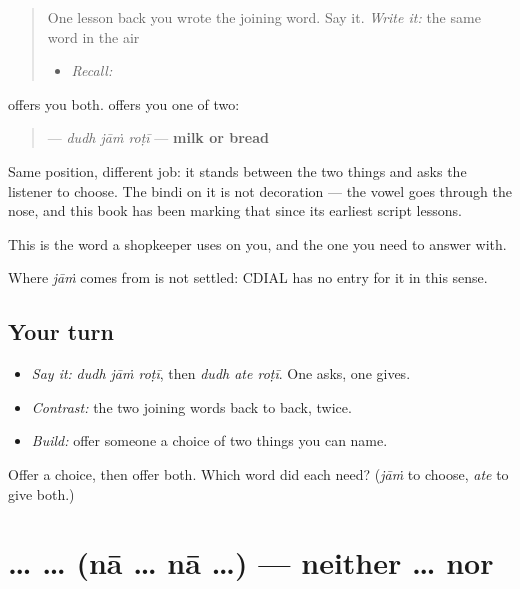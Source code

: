 \begin{quote}
One lesson back you wrote the joining word. Say it. \emph{Write it:} the same word in the air

\begin{itemize}
\raggedright
  \item \emph{Recall:} \textbf{}
\end{itemize}
\end{quote}

\begin{cousinweb}
\textbf{} offers you both. \textbf{} offers you one of two:

\begin{quote}
\textbf{  } — \emph{dudh jāṁ roṭī} — \textbf{milk or bread}
\end{quote}

Same position, different job: it stands between the two things and asks the listener to choose. The bindi on it is not decoration — the vowel goes through the nose, and this book has been marking that since its earliest script lessons.

This is the word a shopkeeper uses on you, and the one you need to answer with.

Where \emph{jāṁ} comes from is not settled: CDIAL has no entry for it in this sense.
\end{cousinweb}

\subsection*{Your turn}
\begin{itemize}
\raggedright
  \item \emph{Say it:} \emph{dudh jāṁ roṭī}, then \emph{dudh ate roṭī}. One asks, one gives.
  \item \emph{Contrast:} the two joining words back to back, twice.
  \item \emph{Build:} offer someone a choice of two things you can name.
\end{itemize}

\begin{tcolorbox}[breakable,colback=teal!4,colframe=teal!35!black,title={Before you move on}]
Offer a choice, then offer both. Which word did each need? (\emph{jāṁ} to choose, \emph{ate} to give both.)
\end{tcolorbox}
\section[\texorpdfstring{\pa{ਨਾ} … \pa{ਨਾ} … (nā … nā …)}{ਨਾ … ਨਾ … (nā … nā …)}]{ …  … (nā … nā …) — neither … nor}

